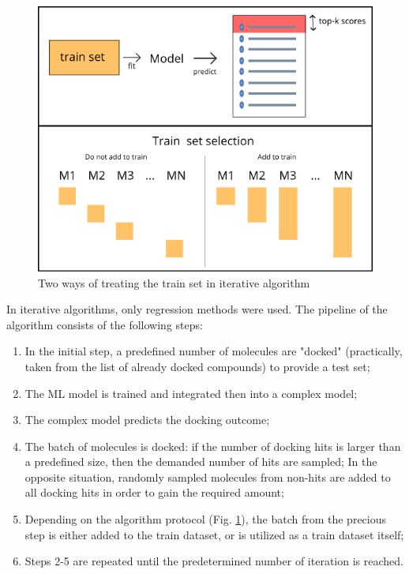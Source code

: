 \begin{figure}
    \centering
    \includegraphics[scale=0.72]{Images/image1.png}
    \caption{Two ways of treating the train set in iterative algorithm}
    \label{TrainSetSelection}
\end{figure}

In iterative algorithms, only regression methods were used.
The pipeline of the algorithm consists of the following steps:
\begin{enumerate}
    \item In the initial step, a predefined number of molecules are "docked" (practically, taken from the list of already docked compounds) to provide a test set;
    \item The ML model is trained and integrated then into a complex model;
    \item The complex model predicts the docking outcome;
    \item The batch of molecules is docked: if the number of docking hits is larger than a predefined size, then the demanded number of hits are sampled;
    In the opposite situation, randomly sampled molecules from non-hits are added 
to all docking hits in order to gain the required amount;
    \item Depending on the algorithm protocol (Fig. \ref{TrainSetSelection}), the batch from the precious step is either added to the train dataset, or is utilized as a train dataset itself;
    \item Steps 2-5 are repeated until the predetermined number of iteration is reached.
\end{enumerate}

